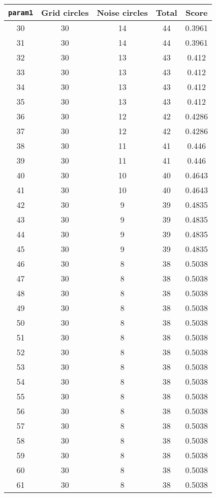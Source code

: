 \documentclass[letterpaper, 12pt]{article}
\begin{document}
\begin{longtable}{|c|c|c|c|c|}
\hline
\textbf{\texttt{param1}} & \textbf{Grid circles} & \textbf{Noise circles} & \textbf{Total} & \textbf{Score} \\
\hline
30 & 30 & 14 & 44 & 0.3961 \\
\hline
31 & 30 & 14 & 44 & 0.3961 \\
\hline
32 & 30 & 13 & 43 & 0.412 \\
\hline
33 & 30 & 13 & 43 & 0.412 \\
\hline
34 & 30 & 13 & 43 & 0.412 \\
\hline
35 & 30 & 13 & 43 & 0.412 \\
\hline
36 & 30 & 12 & 42 & 0.4286 \\
\hline
37 & 30 & 12 & 42 & 0.4286 \\
\hline
38 & 30 & 11 & 41 & 0.446 \\
\hline
39 & 30 & 11 & 41 & 0.446 \\
\hline
40 & 30 & 10 & 40 & 0.4643 \\
\hline
41 & 30 & 10 & 40 & 0.4643 \\
\hline
42 & 30 & 9 & 39 & 0.4835 \\
\hline
43 & 30 & 9 & 39 & 0.4835 \\
\hline
44 & 30 & 9 & 39 & 0.4835 \\
\hline
45 & 30 & 9 & 39 & 0.4835 \\
\hline
46 & 30 & 8 & 38 & 0.5038 \\
\hline
47 & 30 & 8 & 38 & 0.5038 \\
\hline
48 & 30 & 8 & 38 & 0.5038 \\
\hline
49 & 30 & 8 & 38 & 0.5038 \\
\hline
50 & 30 & 8 & 38 & 0.5038 \\
\hline
51 & 30 & 8 & 38 & 0.5038 \\
\hline
52 & 30 & 8 & 38 & 0.5038 \\
\hline
53 & 30 & 8 & 38 & 0.5038 \\
\hline
54 & 30 & 8 & 38 & 0.5038 \\
\hline
55 & 30 & 8 & 38 & 0.5038 \\
\hline
56 & 30 & 8 & 38 & 0.5038 \\
\hline
57 & 30 & 8 & 38 & 0.5038 \\
\hline
58 & 30 & 8 & 38 & 0.5038 \\
\hline
59 & 30 & 8 & 38 & 0.5038 \\
\hline
60 & 30 & 8 & 38 & 0.5038 \\
\hline
61 & 30 & 8 & 38 & 0.5038 \\

\end{longtable}
\end{document}
